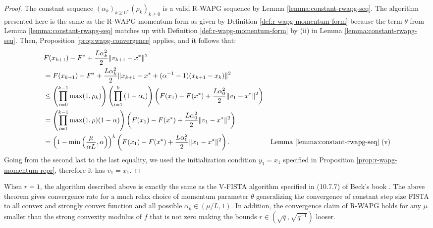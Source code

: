 \documentclass[12pt]{article}
\begin{document}
    \begin{proof}
        The constant sequence $(\alpha_k)_{k \ge 0}, (\rho_k)_{k \ge 0}$ is a valid R-WAPG sequence by Lemma \ref{lemma:constant-rwapg-seq}.
        The algorithm presented here is the same as the R-WAPG momentum form as given by Definition \ref{def:r-wapg-momentum-form} because the term $\theta$ from Lemma \ref{lemma:constant-rwapg-seq} matches up with Definition \ref{def:r-wapg-momentum-form} by (ii) in Lemma \ref{lemma:constant-rwapg-seq}.
        Then, Proposition \ref{prop:wapg-convergence} applies, and it follows that:
        \begin{align*}
            & F(x_{k + 1}) - F^* + \frac{L\alpha_k^2}{2}\Vert v_{k + 1} - x^*\Vert^2
            \\
            &=
            F(x_{k + 1}) - F^* + \frac{L\alpha_k^2}{2}\Vert x_{k + 1}  - x^* + (\alpha^{-1} - 1)(x_{k + 1} - x_k)\Vert^2
            \\
            &\le
            \left(
                \prod_{i = 0}^{k - 1} \max(1, \rho_{k})
            \right)
            \left(
                \prod_{i = 1}^{k} \left(1  - \alpha_i\right)
            \right)
            \left(
                F(x_1) - F(x^*) + \frac{L\alpha_0^2}{2}\Vert v_1 - x^*\Vert^2
            \right)
            \\
            &= \left(
                \prod_{i = 1}^{k - 1} \max(1, \rho)(1 - \alpha)
            \right)
            \left(
                F(x_1) - F(x^*) + \frac{L\alpha_0^2}{2}\Vert v_1 - x^*\Vert^2
            \right)
            \\
            &= \left(1 - \min\left(\frac{\mu}{\alpha L}, \alpha\right)\right)^k
            \left(
                F(x_1) - F(x^*) + \frac{L\alpha_0^2}{2}\Vert x_1 - x^*\Vert^2
            \right).
            & \text{Lemma \ref{lemma:constant-rwapg-seq} (v)}
        \end{align*}
        Going from the second last to the last equality, we used the initialization condition $y_1 = x_1$ specified in Proposition \ref{prop:r-wapg-momentum-repr}, therefore it has $v_1 = x_1$.
    \end{proof}
    \begin{remark}
        When $r = 1$, the algorithm described above is exactly the same as the V-FISTA algorithm specified in (10.7.7) of Beck's book \cite{beck_first-order_2017}.
        The above theorem gives convergence rate for a much relax choice of momentum parameter $\theta$ generalizing the convergence of constant step size FISTA to all convex and strongly convex function and all possible $\alpha_k \in (\mu/L, 1)$.
        In addition, the convergence claim of R-WAPG holds for any $\mu$ smaller than the strong convexity modulus of $f$ that is not zero making the bounds $r \in (\sqrt{q}, \sqrt{q^{-1}})$ looser.
    \end{remark}
\end{document}

